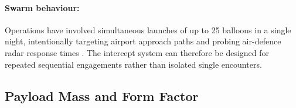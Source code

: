 \paragraph{Swarm behaviour:}
Operations have involved simultaneous launches of up to 25 balloons in a single night, intentionally targeting airport approach paths and probing air-defence radar response times \cite{RFE/RLBelarusService2025UpBoth, TheIndependent2026BalloonsNight, OperationalCommandofthePolishArmedForces2026StatementBelarus}. The intercept system can therefore be designed for repeated sequential engagements rather than isolated single encounters.
\vspace{-10pt}

\subsection{Payload Mass and Form Factor}
\label{subsec:payload_form}
 \vspace{-10pt}
